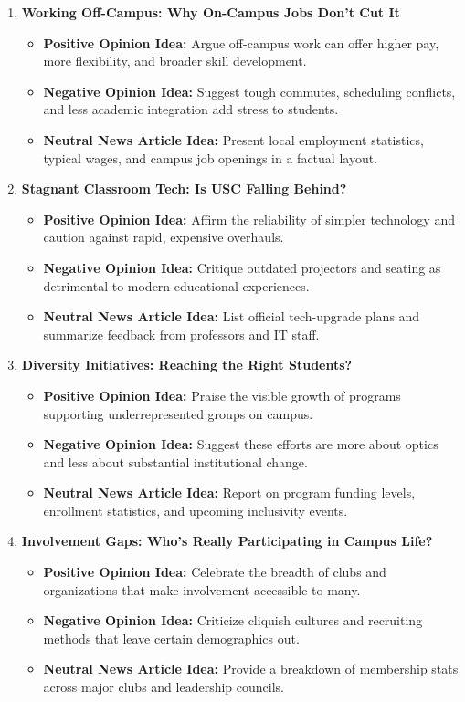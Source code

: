 \documentclass{article}
\begin{document}
\begin{enumerate}
    \item \textbf{Working Off-Campus: Why On-Campus Jobs Don’t Cut It}
    \begin{itemize}
        \item \textbf{Positive Opinion Idea:} Argue off-campus work can offer higher pay, more flexibility, and broader skill development.
        \item \textbf{Negative Opinion Idea:} Suggest tough commutes, scheduling conflicts, and less academic integration add stress to students.
        \item \textbf{Neutral News Article Idea:} Present local employment statistics, typical wages, and campus job openings in a factual layout.
    \end{itemize}

    \item \textbf{Stagnant Classroom Tech: Is USC Falling Behind?}
    \begin{itemize}
        \item \textbf{Positive Opinion Idea:} Affirm the reliability of simpler technology and caution against rapid, expensive overhauls.
        \item \textbf{Negative Opinion Idea:} Critique outdated projectors and seating as detrimental to modern educational experiences.
        \item \textbf{Neutral News Article Idea:} List official tech-upgrade plans and summarize feedback from professors and IT staff.
    \end{itemize}

    \item \textbf{Diversity Initiatives: Reaching the Right Students?}
    \begin{itemize}
        \item \textbf{Positive Opinion Idea:} Praise the visible growth of programs supporting underrepresented groups on campus.
        \item \textbf{Negative Opinion Idea:} Suggest these efforts are more about optics and less about substantial institutional change.
        \item \textbf{Neutral News Article Idea:} Report on program funding levels, enrollment statistics, and upcoming inclusivity events.
    \end{itemize}

    \item \textbf{Involvement Gaps: Who’s Really Participating in Campus Life?}
    \begin{itemize}
        \item \textbf{Positive Opinion Idea:} Celebrate the breadth of clubs and organizations that make involvement accessible to many.
        \item \textbf{Negative Opinion Idea:} Criticize cliquish cultures and recruiting methods that leave certain demographics out.
        \item \textbf{Neutral News Article Idea:} Provide a breakdown of membership stats across major clubs and leadership councils.
    \end{itemize}


\end{enumerate}
\end{document}
